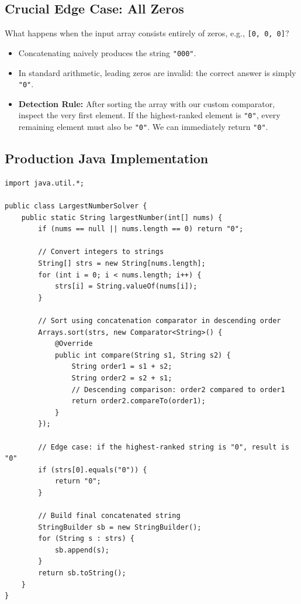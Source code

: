 \documentclass[10pt,journal,compsoc,onecolumn]{IEEEtran}
\begin{document}
\subsection{Crucial Edge Case: All Zeros}

What happens when the input array consists entirely of zeros, e.g., \texttt{[0, 0, 0]}?
\begin{itemize}
    \item Concatenating naively produces the string \texttt{"000"}.
    \item In standard arithmetic, leading zeros are invalid: the correct answer is simply \texttt{"0"}.
    \item \textbf{Detection Rule:} After sorting the array with our custom comparator, inspect the very first element. If the highest-ranked element is \texttt{"0"}, every remaining element must also be \texttt{"0"}. We can immediately return \texttt{"0"}.
\end{itemize}

\subsection{Production Java Implementation}

\begin{verbatim}
import java.util.*;

public class LargestNumberSolver {
    public static String largestNumber(int[] nums) {
        if (nums == null || nums.length == 0) return "0";

        // Convert integers to strings
        String[] strs = new String[nums.length];
        for (int i = 0; i < nums.length; i++) {
            strs[i] = String.valueOf(nums[i]);
        }

        // Sort using concatenation comparator in descending order
        Arrays.sort(strs, new Comparator<String>() {
            @Override
            public int compare(String s1, String s2) {
                String order1 = s1 + s2;
                String order2 = s2 + s1;
                // Descending comparison: order2 compared to order1
                return order2.compareTo(order1);
            }
        });

        // Edge case: if the highest-ranked string is "0", result is "0"
        if (strs[0].equals("0")) {
            return "0";
        }

        // Build final concatenated string
        StringBuilder sb = new StringBuilder();
        for (String s : strs) {
            sb.append(s);
        }
        return sb.toString();
    }
}
\end{verbatim}
\end{document}
